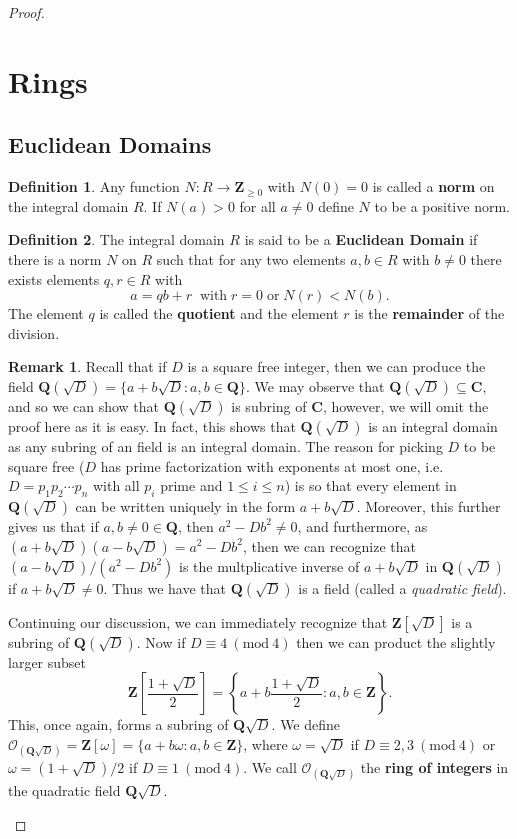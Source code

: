 \documentclass[9pt,reqno]{amsart}
\theoremstyle{definition}
\newtheorem{defi}{Definition}[section]
\newtheorem{rem}{Remark}[section]
\newcommand{\cc}{\mathbf C}
\newcommand{\zz}{\mathbf Z}
\newcommand{\qq}{\mathbf Q}
\newcommand{\Mod}[1]{\ (\mathrm{mod}\ #1)}
\begin{document}
\begin{proof}
\section{Rings}
\subsection{Euclidean Domains}


\begin{defi} Any function $N \colon R \to \zz_{\geq 0}$ with $N(0) = 0$ is called a \textbf{norm} on the integral domain $R$. If $N(a) > 0$ for all $a \neq 0$ define $N$ to be a positive norm.
\end{defi}

\begin{defi}
	The integral domain $R$ is said to be a \textbf{Euclidean Domain} if there is a norm $N$ on $R$ such that for any two elements $a, b \in R$ with $b \neq 0 $ there exists elements $q, r \in R$ with $$ a = qb + r \; \; \text{with} \; r =0 \; \text{or} \; N(r) < N(b).$$
	The element $q$ is called the \textbf{quotient} and the element $r$ is the \textbf{remainder} of the division. 
\end{defi}
\begin{rem}
Recall that if $D$ is a square free integer, then we can produce the field $\mathbf{Q} (\sqrt{D} ) = \{a +b \sqrt{D} \colon a, b \in \qq \}$. We may observe that $\qq (\sqrt{D} ) \subseteq \cc$, and so we can show that $\qq (\sqrt{D})$ is subring of $\cc$, however, we will omit the proof here as it is easy. In fact, this shows that $\qq (\sqrt{D})$ is an integral domain as any subring of an field is an integral domain. The reason for picking $D$ to be square free ($D$ has prime factorization with exponents at most one, i.e. $D = p_1 p_2 \cdots p_n$ with all $p_i$ prime and $1 \leq i \leq n$) is so that every element in $\qq (\sqrt{D})$ can be written uniquely in the form $a+b \sqrt{D}$. Moreover, this further gives us that if $a, b \neq 0 \in \qq$, then $a^2 - Db^2 \neq 0$, and furthermore, as $(a+b\sqrt{D})(a-b\sqrt{D}) = a^2 - Db^2$, then we can recognize that $(a-b\sqrt{D})/(a^2 - Db^2)$ is the multplicative inverse of $a+b\sqrt{D}$ in $\qq (\sqrt{D})$ if $a+b\sqrt{D} \neq 0$. Thus we have that $\qq (\sqrt{D})$ is a field (called a \textit{quadratic field}).

Continuing our discussion, we can immediately recognize that $\zz [\sqrt{D}] $ is a subring of $\qq (\sqrt{D})$. Now if $D \equiv 4 \Mod{4}$ then we can product the slightly larger subset $$\zz \left [ \frac{1+\sqrt{D}}{2} \right] =  \left \{ a+b \frac{1+ \sqrt{D}}{2} \colon a, b \in \zz \right \}. $$ This, once again, forms a subring of $\qq \sqrt{D}$. We define $\mathcal{O}_{(\qq \sqrt{D})} = \zz [\omega ] = \{a + b \omega \colon a, b \in \zz \}$, where $\omega = \sqrt{D}$ if $D \equiv 2, 3 \Mod{4}$ or $\omega = (1+\sqrt{D})/ 2$ if $D \equiv 1 \Mod{4}$. We call $\mathcal {O}_{ (\qq \sqrt{D} )}$ the \textbf{ring of integers} in the quadratic field $\qq\sqrt{D}$. 


\end{rem}
\end{proof}
\end{document}
